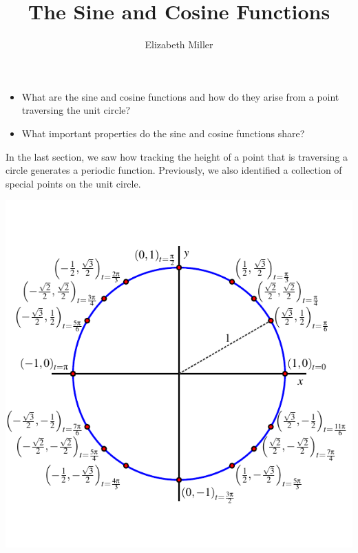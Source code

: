 \documentclass[nooutcomes]{ximera}
\author{Elizabeth Miller}
\title{The Sine and Cosine Functions}
\begin{document}
\licenseAPC
\begin{abstract}
  
\end{abstract}
\maketitle



\begin{motivatingQuestions}\begin{itemize}
\item What are the sine and cosine functions and how do they arise from a point traversing the unit circle?%
\item What important properties do the sine and cosine functions share?%
\end{itemize}\end{motivatingQuestions}



In the last section, we saw how tracking the height of a point that is traversing a circle generates a periodic function.  Previously, we also identified a collection of special points on the unit circle.
\begin{image}
\includegraphics[width=\textwidth]{unit-circle-16-all-labeled.pdf}
\end{image}
\end{document}
